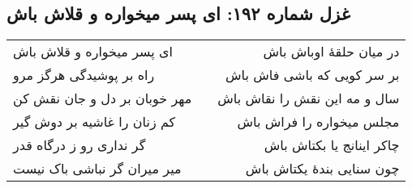 \begin{center}
\section*{غزل شماره ۱۹۲: ای پسر میخواره و قلاش باش}
\label{sec:192}
\begin{longtable}{l p{0.5cm} r}
ای پسر میخواره و قلاش باش
&&
در میان حلقهٔ اوباش باش
\\
راه بر پوشیدگی هرگز مرو
&&
بر سر کویی که باشی فاش باش
\\
مهر خوبان بر دل و جان نقش کن
&&
سال و مه این نقش را نقاش باش
\\
کم زنان را غاشیه بر دوش گیر
&&
مجلس میخواره را فراش باش
\\
گر نداری رو ز درگاه قدر
&&
چاکر اینانج یا بکتاش باش
\\
میر میران گر نباشی باک نیست
&&
چون سنایی بندهٔ یکتاش باش
\\
\end{longtable}
\end{center}
